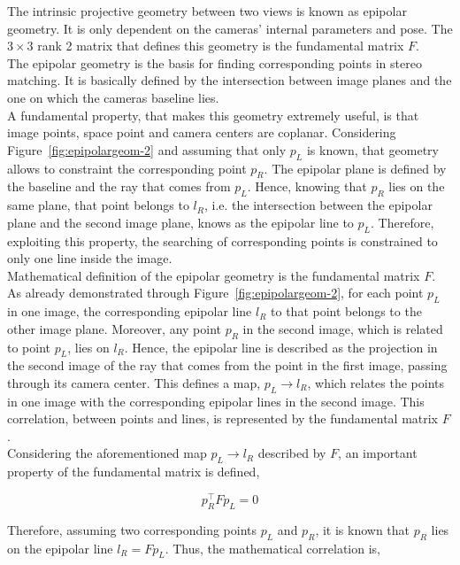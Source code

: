 The intrinsic projective geometry between two views is known as epipolar geometry.
It is only dependent on the cameras' internal parameters and pose.
The $3 \times 3$ rank 2 matrix that defines this geometry is the fundamental matrix $F$.\\
The epipolar geometry is the basis for finding corresponding points in stereo matching. 
It is basically defined by the intersection between image planes and the one on which the cameras baseline lies.\\
A fundamental property, that makes this geometry extremely useful, is that image points, space point and camera centers are coplanar. 
Considering Figure~\ref{fig:epipolargeom-2} and assuming that only $p_L$ is known, that geometry allows to constraint the corresponding point $p_R$. 
The epipolar plane is defined by the baseline and the ray that comes from $p_L$. 
Hence, knowing that $p_R$ lies on the same plane, that point belongs to $l_R$, i.e. the intersection between the epipolar plane and the second image plane, knows as the epipolar line to $p_L$.
Therefore, exploiting this property, the searching of corresponding points is constrained to only one line inside the image.\\
Mathematical definition of the epipolar geometry is the fundamental matrix $F$.
As already demonstrated through Figure~\ref{fig:epipolargeom-2}, for each point $p_L$ in one image, the corresponding epipolar line $l_R$ to that point belongs to the other image plane. 
Moreover, any point $p_R$ in the second image, which is related to point $p_L$, lies on $l_R$.
Hence, the epipolar line is described as the projection in the second image of the ray that comes from the point in the first image, passing through its camera center.
This defines a map, $p_L \rightarrow l_R$, which relates the points in one image with the corresponding epipolar lines in the second image.
This correlation, between points and lines, is represented by the fundamental matrix $F$.\\
Considering the aforementioned map $p_L \rightarrow l_R$ described by $F$, an important property of the fundamental matrix is defined,

\begin{equation}
\label{eqn:fundmatprop}
	p_R^\top F p_L = 0
\end{equation}

Therefore, assuming two corresponding points $p_L$ and $p_R$, it is known that $p_R$ lies on the epipolar line $l_R = F p_L$. 
Thus, the mathematical correlation is,

